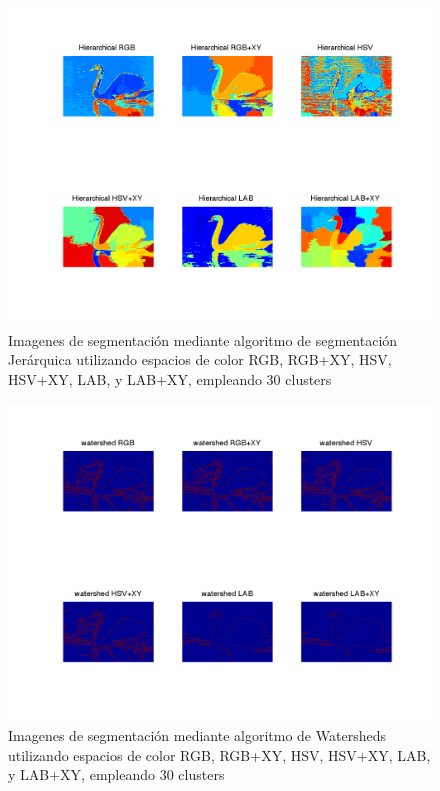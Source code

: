 \documentclass[10pt,twocolumn,letterpaper]{article}
\begin{document}
\begin{figure}
\begin{center}
   \includegraphics[scale = 0.40]{segmentacionsPruebaHierarchical}
\end{center}
   \caption{Imagenes de segmentación mediante algoritmo de segmentación Jerárquica utilizando espacios de color RGB, RGB+XY, HSV, HSV+XY, LAB, y LAB+XY, empleando 30 clusters}
\end{figure}

\begin{figure}
\begin{center}
   \includegraphics[scale = 0.40]{segmentacionsPruebaWatershed}
\end{center}
   \caption{Imagenes de segmentación mediante algoritmo de Watersheds utilizando espacios de color RGB, RGB+XY, HSV, HSV+XY, LAB, y LAB+XY, empleando 30 clusters}
\end{figure}
\end{document}
